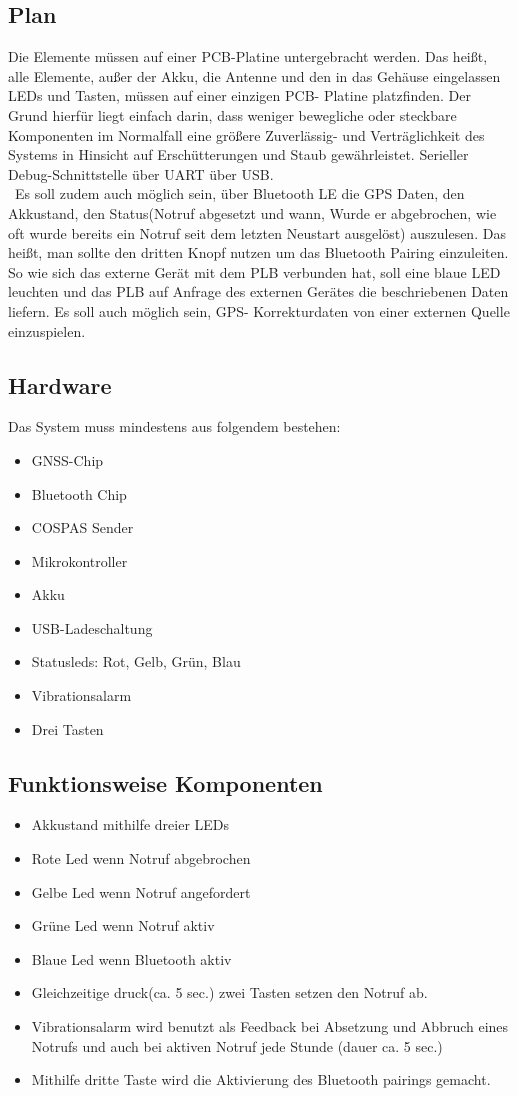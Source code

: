 \subsection{Plan}
Die Elemente müssen auf einer PCB-Platine untergebracht werden. Das heißt, alle Elemente, außer der Akku, die Antenne und den in das Gehäuse eingelassen LEDs und Tasten, müssen auf einer einzigen PCB- Platine platzfinden. Der Grund hierfür liegt einfach darin, dass weniger bewegliche oder steckbare Komponenten im Normalfall eine größere Zuverlässig- und Verträglichkeit des Systems in Hinsicht auf Erschütterungen und Staub gewährleistet. Serieller Debug-Schnittstelle über UART über USB.\\\
Es soll zudem auch möglich sein, über Bluetooth LE die GPS Daten, den Akkustand, den Status(Notruf abgesetzt und wann, Wurde er abgebrochen, wie oft wurde bereits ein Notruf seit dem letzten Neustart ausgelöst) auszulesen. Das heißt, man sollte den dritten Knopf nutzen um das Bluetooth Pairing einzuleiten. So wie sich das externe Gerät mit dem PLB verbunden hat, soll eine blaue LED leuchten und das PLB auf Anfrage des externen Gerätes die beschriebenen Daten liefern. Es soll auch möglich sein, GPS- Korrekturdaten von einer externen Quelle einzuspielen.

\subsection{Hardware}
Das System muss mindestens aus folgendem bestehen:
\begin{itemize}
	\item GNSS-Chip
	\item Bluetooth Chip
	\item COSPAS Sender
	\item Mikrokontroller
	\item Akku
	\item USB-Ladeschaltung
	\item Statusleds: Rot, Gelb, Grün, Blau 
	\item Vibrationsalarm
	\item Drei Tasten
\end{itemize}

\subsection{Funktionsweise Komponenten}
\begin{itemize}
	\item Akkustand mithilfe dreier LEDs
	\item Rote Led wenn Notruf abgebrochen
	\item Gelbe Led wenn Notruf angefordert
	\item Grüne Led wenn Notruf aktiv
	\item Blaue Led wenn Bluetooth aktiv
	\item Gleichzeitige druck(ca. 5 sec.) zwei Tasten setzen den Notruf ab.
	\item Vibrationsalarm wird benutzt als Feedback bei Absetzung und Abbruch eines Notrufs und auch bei aktiven Notruf jede Stunde (dauer ca. 5 sec.)
	\item Mithilfe dritte Taste wird die Aktivierung des Bluetooth pairings gemacht.
\end{itemize}

